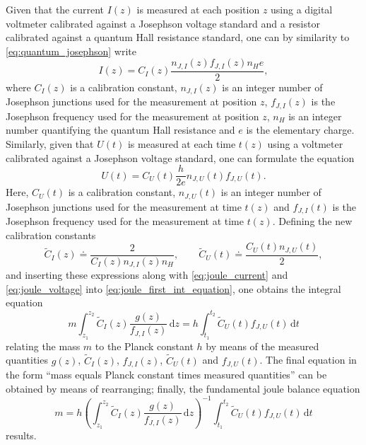 \documentclass{report}
\numberwithin{tm}{section}
\begin{document}
Given that the current $I(z)$ is measured at each position $z$ using a digital voltmeter calibrated against a Josephson voltage standard and a resistor calibrated against a quantum Hall resistance standard, one can by similarity to \cref{eq:quantum_josephson} write \begin{equation}\label{eq:joule_current}
	I(z) = C_I(z)\frac{n_{J,I}(z)f_{J,I}(z)n_H e}{2},
\end{equation} where $C_I(z)$ is a calibration constant, $n_{J,I}(z)$ is an integer number of Josephson junctions used for the measurement at position $z$, $f_{J,I}(z)$ is the Josephson frequency used for the measurement at position $z$, $n_H$ is an integer number quantifying the quantum Hall resistance and $e$ is the elementary charge. Similarly, given that $U(t)$ is measured at each time $t(z)$ using a voltmeter calibrated against a Josephson voltage standard, one can formulate the equation \begin{equation}\label{eq:joule_voltage}
U(t) = C_U(t)\frac{h}{2e}n_{J,U}(t)f_{J,U}(t).
\end{equation} Here, $C_U(t)$ is a calibration constant, $n_{J,U}(t)$ is an integer number of Josephson junctions used for the measurement at time $t(z)$ and $f_{J,I}(t)$ is the Josephson frequency used for the measurement at time $t(z)$. Defining the new calibration constants \begin{equation}
\tilde{C}_I(z) \doteq \frac{2}{C_I(z)n_{J,I}(z)n_H}, \qquad \tilde{C}_U(t) \doteq \frac{C_U(t)n_{J,U}(t)}{2},
\end{equation} and inserting these expressions along with \cref{eq:joule_current} and \cref{eq:joule_voltage} into \cref{eq:joule_first_int_equation}, one obtains the integral equation \begin{equation}
m\int_{z_1}^{z_2}\tilde{C}_I(z)\frac{g(z)}{f_{J,I}(z)}\,\mathrm{d}z = h \int_{t_1}^{t_2}\tilde{C}_U(t)f_{J,U}(t)\,\mathrm{d}t
\end{equation} relating the mass $m$ to the Planck constant $h$ by means of the measured quantities $g(z)$, $\tilde{C}_I(z)$, $f_{J,I}(z)$, $\tilde{C}_U(t)$ and $f_{J,U}(t)$. The final equation in the form ``mass equals Planck constant times measured quantities'' can be obtained by means of rearranging; finally, the fundamental joule balance equation \begin{equation}\label{eq:fundamental_joule_balance_equation}
m = h\left(\int_{z_1}^{z_2}\tilde{C}_I(z)\frac{g(z)}{f_{J,I}(z)}\,\mathrm{d}z\right)^{-1}\int_{t_1}^{t_2}\tilde{C}_U(t)f_{J,U}(t)\,\mathrm{d}t
\end{equation} results.
\end{document}
